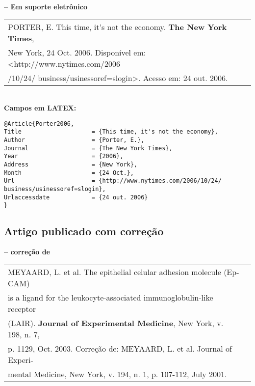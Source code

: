 \textbf{-- Em suporte eletrônico} \\
	
\begin{tabular}{|l|c|} \hline
	PORTER, E. This time, it's not the economy. \textbf{The New York Times}, \\New 
	York, 24 Oct. 2006. Disponível em: <http://www.nytimes.com/2006         \\/10/24/
	business/usinessoref=slogin>. Acesso em: 24 out. 2006.                   \\\hline
\end{tabular} \\
	
\textbf{Campos em LATEX:} 
	
\begingroup
\fontsize{10pt}{12pt}\selectfont
\begin{verbatim}
@Article{Porter2006,
Title                    = {This time, it's not the economy},
Author                   = {Porter, E.},
Journal                  = {The New York Times},
Year                     = {2006},
Address                  = {New York},
Month                    = {24 Oct.},
Url                      = {http://www.nytimes.com/2006/10/24/
business/usinessoref=slogin},
Urlaccessdate            = {24 out. 2006}
}
\end{verbatim}
\endgroup
	
\subsection{Artigo publicado com correção}
	
\textbf{-- correção de} \\
	
\begin{tabular}{|l|c|} \hline
	MEYAARD, L. et al. The epithelial celular adhesion molecule (Ep-CAM)     \\
	is a ligand for the leukocyte-associated immunoglobulin-like receptor    
	                                                                         \\(LAIR). \textbf{Journal of Experimental Medicine}, New York, v. 198, n. 7,\\ 
	p.	1129, Oct. 2003. Correção de: MEYAARD, L. et al. Journal of Experi- \\mental Medicine, New York, v. 194, n. 1, p. 107-112, July 2001.\\\hline
\end{tabular} \\
	
